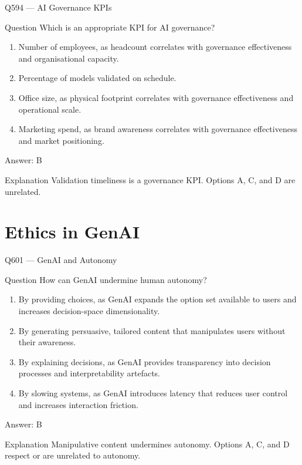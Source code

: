 \documentclass[aspectratio=169,8pt]{beamer}
\begin{document}
	\begin{frame}{Q594 --- AI Governance KPIs}
		\begin{block}{Question}
			Which is an appropriate KPI for AI governance?
			\begin{enumerate}
				\item Number of employees, as headcount correlates with governance effectiveness and organisational capacity.
				\item Percentage of models validated on schedule.
				\item Office size, as physical footprint correlates with governance effectiveness and operational scale.
				\item Marketing spend, as brand awareness correlates with governance effectiveness and market positioning.
			\end{enumerate}
		\end{block}
		\begin{exampleblock}{Answer: B}\end{exampleblock}
		\begin{block}{Explanation}
			Validation timeliness is a governance KPI. Options A, C, and D are unrelated.
		\end{block}
	\end{frame}

	

	



	
	
	\section{Ethics in GenAI}
	
	\begin{frame}{Q601 --- GenAI and Autonomy}
		\begin{block}{Question}
			How can GenAI undermine human autonomy?
			\begin{enumerate}
				\item By providing choices, as GenAI expands the option set available to users and increases decision-space dimensionality.
				\item By generating persuasive, tailored content that manipulates users without their awareness.
				\item By explaining decisions, as GenAI provides transparency into decision processes and interpretability artefacts.
				\item By slowing systems, as GenAI introduces latency that reduces user control and increases interaction friction.
			\end{enumerate}
		\end{block}
		\begin{exampleblock}{Answer: B}\end{exampleblock}
		\begin{block}{Explanation}
			Manipulative content undermines autonomy. Options A, C, and D respect or are unrelated to autonomy.
		\end{block}
	\end{frame}
	
\end{document}
